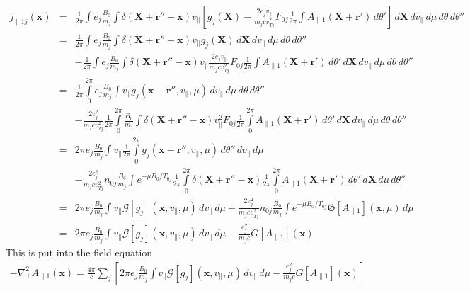 \begin{eqnarray*}
  j_{\|1j}(\mathbf{x}) 
  &=& \frac{1}{2\pi}\int e_j\frac{B_0}{m_j}\int \delta(\mathbf{X}+\mathbf{r}''-\mathbf{x})
  v_\|\left[
    g_j(\mathbf{X})-\frac{2e_jv_\|}{m_jcv_{Tj}^2}
    F_{0j}\frac{1}{2\pi}\int A_{\|1}(\mathbf{X}+\mathbf{r}')\,d\theta'
  \right]\,d\mathbf{X}\,dv_\|\,d\mu\,d\theta\,d\theta''\\
  &=& \frac{1}{2\pi}\int e_j\frac{B_0}{m_j}\int \delta(\mathbf{X}+\mathbf{r}''-\mathbf{x})
  v_\|g_j(\mathbf{X})\,d\mathbf{X}\,dv_\|\,d\mu\,d\theta\,d\theta''\\
  &&-\frac{1}{2\pi}\int e_j\frac{B_0}{m_j}\int \delta(\mathbf{X}+\mathbf{r}''-\mathbf{x})
  v_\|\frac{2e_jv_\|}{m_jcv_{Tj}^2}
  F_{0j}\frac{1}{2\pi}\int A_{\|1}(\mathbf{X}+\mathbf{r}')\,d\theta'\,d\mathbf{X}\,dv_\|\,d\mu\,d\theta\,d\theta''\\
  &=& \frac{1}{2\pi}\int\limits_0^{2\pi} e_j
  \frac{B_0}{m_j}\int v_\|g_j(\mathbf{x}-\mathbf{r}'',v_\|,\mu)\,dv_\|\,d\mu\,d\theta\,d\theta''\\
  &&-\frac{2e_j^2}{m_jcv_{Tj}^2}\frac{1}{2\pi}\int\limits_0^{2\pi} \frac{B_0}{m_j}\int \delta(\mathbf{X}+\mathbf{r}''-\mathbf{x})
  v_\|^2 F_{0j}\frac{1}{2\pi}\int\limits_0^{2\pi} 
  A_{\|1}(\mathbf{X}+\mathbf{r}')\,d\theta'\,d\mathbf{X}\,dv_\|\,d\mu\,d\theta\,d\theta''\\
  &=&  2\pi e_j\frac{B_0}{m_j}\int v_\|
  \frac{1}{2\pi}\int\limits_0^{2\pi}g_j(\mathbf{x}-\mathbf{r}'',v_\|,\mu)\,d\theta''\,dv_\|\,d\mu\\
  &&-\frac{2e_j^2}{m_jcv_{Tj}^2}n_{0j} \frac{B_0}{m_j}\int e^{-\mu B_0/T_{0j}}
  \frac{1}{2\pi}\int\limits_0^{2\pi} \delta(\mathbf{X}+\mathbf{r}''-\mathbf{x})
  \frac{1}{2\pi}\int\limits_0^{2\pi} A_{\|1}(\mathbf{X}+\mathbf{r}')\,d\theta'\,d\mathbf{X}\,d\mu\,d\theta''\\
  &=&  2\pi e_j\frac{B_0}{m_j}\int v_\| \mathcal{G}[g_j](\mathbf{x},v_\|,\mu)\,dv_\|\,d\mu
  -\frac{2e_j^2}{m_jcv_{Tj}^2}n_{0j} \frac{B_0}{m_j}\int e^{-\mu B_0/T_{0j}}
  \mathfrak{G}[A_{\|1}](\mathbf{x},\mu)\,d\mu\\
  &=&  2\pi e_j\frac{B_0}{m_j}\int v_\| \mathcal{G}[g_j](\mathbf{x},v_\|,\mu)\,dv_\|\,d\mu
  -\frac{e_j^2}{m_jc} G[A_{\|1}](\mathbf{x})
\end{eqnarray*}
This is put into the field equation
\begin{eqnarray*}
  -\nabla_\bot^2 A_{\|1}(\mathbf{x}) 
  = \frac{4\pi}{c}\sum_j \left[
    2\pi e_j\frac{B_0}{m_j}\int v_\| \mathcal{G}[g_j](\mathbf{x},v_\|,\mu)\,dv_\|\,d\mu
    -\frac{e_j^2}{m_jc} G[A_{\|1}](\mathbf{x})
  \right]
\end{eqnarray*}
